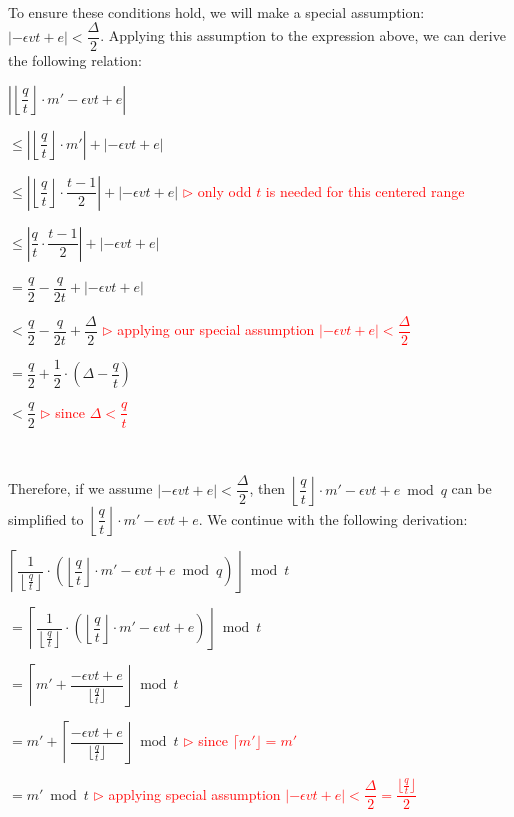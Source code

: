 $ $

To ensure these conditions hold, we will make a special assumption: $|-\epsilon vt + e| < \dfrac{\Delta}{2}$. Applying this assumption to the expression above, we can derive the following relation:

$\left|\left\lfloor\dfrac{q}{t}\right\rfloor\cdot m'  - \epsilon vt + e\right| $

$ \leq \left|\left\lfloor\dfrac{q}{t}\right\rfloor\cdot m'\right| + \left|- \epsilon vt + e\right|$

$ \leq \left|\left\lfloor\dfrac{q}{t}\right\rfloor\cdot \dfrac{t-1}{2}\right| + \left|- \epsilon vt + e\right|$ \textcolor{red}{ $\rhd$ only odd $t$ is needed for this centered range}

$ \leq \left|\dfrac{q}{t}\cdot \dfrac{t-1}{2}\right| + \left|- \epsilon vt + e\right|$

$ = \dfrac{q}{2} - \dfrac{q}{2t} + \left|- \epsilon vt + e\right|$

$ < \dfrac{q}{2} - \dfrac{q}{2t} + \dfrac{\Delta}{2}$ \textcolor{red}{ $\rhd$ applying our special assumption $|-\epsilon vt + e| < \dfrac{\Delta}{2}$}

$ = \dfrac{q}{2} + \dfrac{1}{2}\cdot \left(\Delta - \dfrac{q}{t}\right)$

$< \dfrac{q}{2}$ \textcolor{red}{ $\rhd$ since $\Delta < \dfrac{q}{t}$}


$ $

Therefore, if we assume $|-\epsilon vt + e| < \dfrac{\Delta}{2}$, then $\left\lfloor\dfrac{q}{t}\right\rfloor\cdot m'  - \epsilon vt + e \bmod q$ can be simplified to $\left\lfloor\dfrac{q}{t}\right\rfloor\cdot m'  - \epsilon vt + e$. We continue with the following derivation: 


$\left\lceil\dfrac{1}{\left\lfloor\frac{q}{t}\right\rfloor} \cdot \left(\left\lfloor\dfrac{q}{t}\right\rfloor\cdot m'  - \epsilon vt + e \bmod q \right)\right\rfloor \bmod t$ 

$= \left\lceil\dfrac{1}{\left\lfloor\frac{q}{t}\right\rfloor} \cdot \left(\left\lfloor\dfrac{q}{t}\right\rfloor\cdot m'  - \epsilon vt + e \right)\right\rfloor \bmod t$ 



$= \left\lceil m' + \dfrac{-\epsilon  vt + e  }{\lfloor\frac{q}{t}\rfloor} \right\rfloor \bmod t$ 

$= m' + \left\lceil \dfrac{-\epsilon vt + e }{\lfloor\frac{q}{t}\rfloor} \right\rfloor \bmod t$ \textcolor{red}{ $\rhd$ since $\lceil m' \rfloor = m'$}

$= m' \bmod t$  \textcolor{red}{ $\rhd$ applying special assumption $|-\epsilon vt + e| < \dfrac{\Delta}{2} = \dfrac{\lfloor\frac{q}{t}\rfloor}{2}$}

